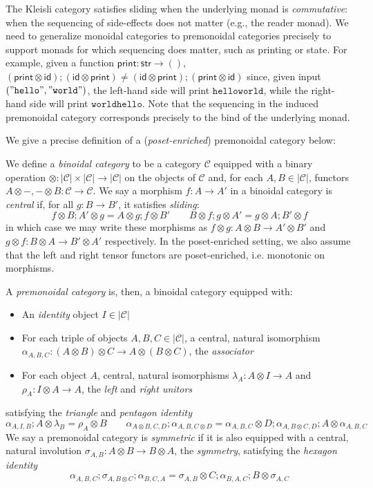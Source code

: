 \documentclass[acmsmall,screen,review]{acmart}
\newcommand{\mc}[1]{\ensuremath{\mathcal{#1}}}
\newcommand{\ms}[1]{\ensuremath{\mathsf{#1}}}
\begin{document}
The Kleisli category satisfies sliding when the underlying monad is \emph{commutative}: when the
sequencing of side-effects does not matter (e.g., the reader monad). We need to generalize monoidal
categories to premonoidal categories precisely to support monads for which sequencing does matter,
such as printing or state. For example, given a function $\ms{print}: \ms{str} \to ()$,
$
(\ms{print} \otimes \ms{id}) ; (\ms{id} \otimes \ms{print}) \neq
(\ms{id} \otimes \ms{print}) ; (\ms{print} \otimes \ms{id}) 
$
since, given input $(\mathtt{"hello"}, \mathtt{"world"})$, the left-hand side will print
$\mathtt{hello world}$, while the right-hand side will print $\mathtt{world hello}$. Note that the
sequencing in the induced premonoidal category corresponds precisely to the bind of the underlying
monad.

We give a precise definition of a (\emph{poset-enriched}) premonoidal category below:
\begin{definition}
  We define a \emph{binoidal category} to be a category $\mc{C}$ equipped with a binary operation
  $\otimes : |\mc{C}| \times |\mc{C}| \to |\mc{C}|$ on the objects of $\mc{C}$ and, for each $A, B
  \in |\mc{C}|$, functors $A \otimes -, - \otimes B : \mc{C} \to \mc{C}$. We say a morphism $f : A
  \to A'$ in a binoidal category is \emph{central} if, for all $g : B \to B'$, it satisfies
  \emph{sliding}:
  $$
  f \otimes B ; A' \otimes g = A \otimes g ; f \otimes B' \qquad
  B \otimes f ; g \otimes A' = g \otimes A ; B' \otimes f
  $$
  in which case we may write these morphisms as $f \otimes g : A \otimes B \to A' \otimes B'$ and $g
  \otimes f : B \otimes A \to B' \otimes A'$ respectively. In the poset-enriched setting, we also
  assume that the left and right tensor functors are poset-enriched, i.e. monotonic on morphisms.
  
  A \emph{premonoidal category} is, then, a
  binoidal category equipped with:
  \begin{itemize}
    \item An \emph{identity} object $I \in |\mc{C}|$
    \item For each triple of objects $A, B, C \in |\mc{C}|$, a central, natural isomorphism
    $\alpha_{A, B, C} : (A \otimes B) \otimes C \to A \otimes (B \otimes C)$, the \emph{associator}
    \item For each object $A$, central, natural isomorphisms $\lambda_A : A \otimes I \to A$ and
    $\rho_A : I \otimes A \to A$, the \emph{left} and \emph{right unitors}
  \end{itemize}
  satisfying the \emph{triangle} and \emph{pentagon identity}
  $$
  \alpha_{A, I, B} ; A \otimes \lambda_B = \rho_A \otimes B \qquad
  \alpha_{A \otimes B, C, D} ; \alpha_{A, B, C \otimes D}
  = \alpha_{A, B, C} \otimes D ; \alpha_{A, B \otimes C, D} ; A \otimes \alpha_{A, B, C}
  $$
  We say a premonoidal category is \emph{symmetric} if it is also equipped with a central, natural
  involution $\sigma_{A, B} : A \otimes B \to B \otimes A$, the \textit{symmetry}, satisfying the
  \emph{hexagon identity}
  $$
  \alpha_{A, B, C} ; \sigma_{A, B \otimes C} ; \alpha_{B, C, A}
  = \sigma_{A, B} \otimes C ; \alpha_{B, A, C} ; B \otimes \sigma_{A, C}
  $$
\end{definition}
\end{document}

